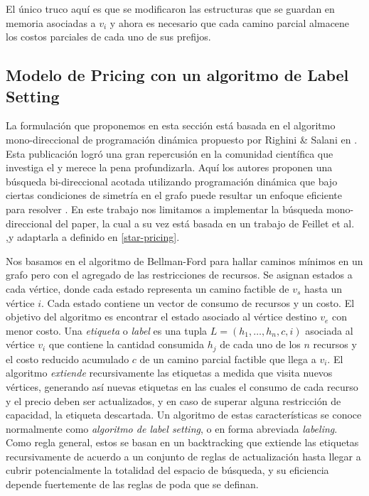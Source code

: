 El único truco aquí es que se modificaron las estructuras que se guardan en memoria asociadas a $v_i$ y ahora es necesario que cada camino parcial almacene los costos parciales de cada uno de sus prefijos.


\subsection{Modelo de Pricing con un algoritmo de Label Setting}
\label{section:pricing-labeling}

La formulación que proponemos en esta sección está basada en el algoritmo mono-direccional de programación dinámica propuesto por Righini \& Salani en \cite{righini-salani}. Esta publicación logró una gran repercusión en la comunidad científica que investiga el  y merece la pena profundizarla.  Aquí los autores proponen una búsqueda bi-direccional acotada utilizando programación dinámica que bajo ciertas condiciones de simetría en el grafo puede resultar un enfoque eficiente para resolver . En este trabajo nos limitamos a implementar la búsqueda mono-direccional del paper, la cual a su vez está basada en un trabajo de Feillet et al. \cite{feillet-et-al},y adaptarla a  definido en \ref{star-pricing}.

Nos basamos en el algoritmo de Bellman-Ford para hallar caminos mínimos en un grafo pero con el agregado de las restricciones de recursos. Se asignan estados a cada vértice, donde cada estado representa un camino factible de $v_s$ hasta un vértice $i$. Cada estado contiene un vector de consumo de recursos y un costo. El objetivo del algoritmo es encontrar el estado asociado al vértice destino $v_e$ con menor costo.      
Una \emph{etiqueta} o \emph{label} es una tupla $L = (h_1, \dots, h_n, c, i)$ asociada al vértice $v_i$ que contiene la cantidad consumida $h_j$ de cada uno de los $n$ recursos y el costo reducido acumulado $c$ de un camino parcial factible que llega a $v_i$. El algoritmo \emph{extiende} recursivamente las etiquetas a medida que visita nuevos vértices, generando así nuevas etiquetas en las cuales el consumo de cada recurso y el precio deben ser actualizados, y en caso de superar alguna restricción de capacidad, la etiqueta descartada. Un algoritmo de estas características se conoce normalmente como \emph{algoritmo de label setting}, o en forma abreviada \emph{labeling}. Como regla general, estos se basan en un backtracking que extiende las etiquetas recursivamente de acuerdo a un conjunto de reglas de actualización hasta llegar a cubrir potencialmente la totalidad del espacio de búsqueda, y su eficiencia depende fuertemente de las reglas de poda que se definan.


